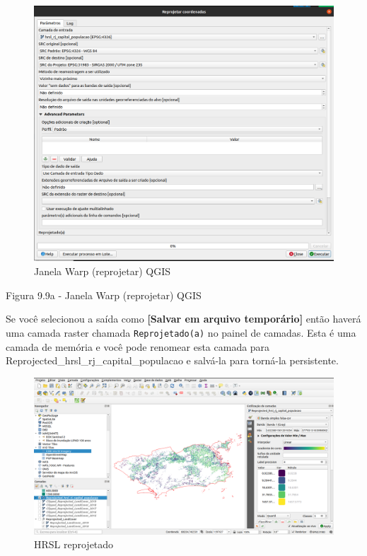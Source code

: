 \documentclass[
]{book}
\begin{document}
\begin{figure}
\centering
\includegraphics{media/modulo9/fig99_a.png}
\caption{Janela Warp (reprojetar) QGIS}
\end{figure}

Figura 9.9a - Janela Warp (reprojetar) QGIS

Se você selecionou a saída como \textbf{{[}Salvar em arquivo temporário{]}} então haverá uma camada raster chamada \texttt{Reprojetado(a)} no painel de camadas. Esta é uma camada de memória e você pode renomear esta camada para Reprojected\_hrsl\_rj\_capital\_populacao e salvá-la para torná-la persistente.

\begin{figure}
\centering
\includegraphics{media/modulo9/fig99_b.png}
\caption{HRSL reprojetado}
\end{figure}
\end{document}

